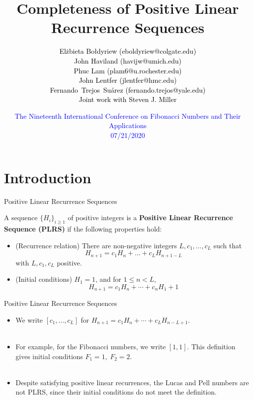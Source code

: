 \documentclass{beamer}
\title[PLRS]
{
  Completeness of Positive Linear Recurrence Sequences
}
\author[Steven J Miller] %
{\textcolor{black}{El\.zbieta Bo\l dyriew (eboldyriew@colgate.edu) \\ John Haviland (havijw@umich.edu) \\ Phuc Lam (plam6@u.rochester.edu) \\ John Lentfer (jlentfer@hmc.edu) \\ Fernando\ Trejos\ Su\'arez (fernando.trejos@yale.edu) \\[0.1in] Joint work with Steven J. Miller}\vspace{-0.25in}}
\date[2020]
{\small{\textcolor{blue}{The Nineteenth International Conference on Fibonacci Numbers and Their Applications \\ 07/21/2020}}
}
\begin{document}
\begin{frame}
  \titlepage
\end{frame}

\large


\section{Introduction}

\begin{frame}{Positive Linear Recurrence Sequences}
    \begin{definition}
        A sequence $\{H_i\}_{i \ge 1}$ of positive integers is a {\bf Positive Linear Recurrence Sequence (PLRS)} if the following properties hold: 
        \begin{itemize}
            \pause
            \item (Recurrence relation) There are non-negative integers $L, c_1, \dots, c_L$ such that \vspace{-0.1in}
                \[ 
                    H_{n+1} = c_1H_n + \dots + c_LH_{n+1-L}
                \]
            with $L, c_1, c_L$ positive.
            \pause
            \item (Initial conditions) $H_1 = 1$, and for $1 \le n < L$, \vspace{-0.1in}
                \[
                    H_{n+1} = c_1H_n + \cdots + c_nH_1 + 1
                \]
        \end{itemize}
    \end{definition}
\end{frame}

\begin{frame}{Positive Linear Recurrence Sequences}
    \begin{itemize}
        \item We write $[c_1, \ldots ,c_L]$ for $H_{n+1} = c_1 H_n + \cdots + c_L H_{n-L+1}$.\\ \
        \pause
        \item For example, for the Fibonacci numbers, we write $[1,1]$. This definition gives initial conditions $F_1=1,\; F_2=2$.\\ \
        \pause
        \item Despite satisfying positive linear recurrences, the Lucas and Pell numbers are not PLRS, since their initial conditions do not meet the definition.
    \end{itemize}
\end{frame}
\end{document}

